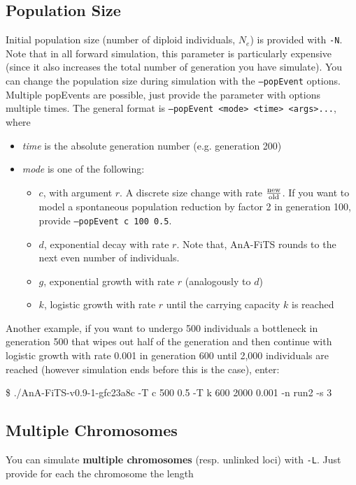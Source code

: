 \documentclass{scrartcl}
\begin{document}
\subsection{Population Size}
\label{sec:population-size}
Initial population size (number of diploid individuals, $N_e$) is
provided with \texttt{-N}. Note that in all forward simulation, this
parameter is particularly expensive (since it also increases the total
number of generation you have simulate). You can change the
population size during simulation with the \texttt{--popEvent}
options. Multiple popEvents are possible, just provide the parameter
with options multiple times. The general format is \texttt{--popEvent
  <mode> <time> <args>...}, where 
\begin{itemize}
\item \textit{time} is the absolute generation number (e.g. generation
  200)
\item \textit{mode} is one of the following: 
  \begin{itemize}
  \item $c$, with argument $r$. A discrete size change with rate
    $\frac{\textnormal{new}}{\textnormal{old}}$. If you want to model
    a spontaneous population reduction by factor 2 in generation 100,
    provide \texttt{--popEvent c 100 0.5}.
  \item $d$, exponential decay with rate $r$. Note that, AnA-FiTS
    rounds to the next even number of individuals.
  \item $g$, exponential growth with rate $r$ (analogously to $d$)
  \item $k$, logistic growth with rate $r$ until the carrying capacity
    $k$ is reached 
  \end{itemize}
\end{itemize}

Another example, if you want to undergo 500 individuals a bottleneck
in generation 500 that wipes out half of the generation and then
continue with logistic growth with rate 0.001 in generation 600 until
2,000 individuals are reached (however simulation ends before this
is the case), enter: 

\$ ./AnA-FiTS-v0.9-1-gfc23a8c  -T c 500 0.5  -T k 600 2000 0.001  -n run2 -s 3


\subsection{Multiple Chromosomes }
\label{sec:mult-chrom-}

You can simulate \textbf{multiple chromosomes} (resp. unlinked loci)
with \texttt{-L}. Just provide for each the chromosome the length
\end{document}
